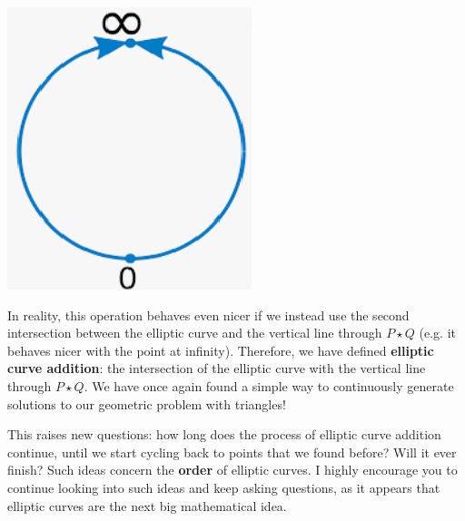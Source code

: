 \documentclass{article}
\begin{document}
\begin{center}
    \includegraphics[scale=1.0]{images/curve4.png}
\end{center}

In reality, this operation behaves even nicer if we instead use the second intersection between the elliptic curve and the vertical line through $P\star Q$ (e.g. it behaves nicer with the point at infinity). Therefore, we have defined \textbf{elliptic curve addition}: the intersection of the elliptic curve with the vertical line through $P\star Q$. We have once again found a simple way to continuously generate solutions to our geometric problem with triangles!

This raises new questions: how long does the process of elliptic curve addition continue, until we start cycling back to points that we found before? Will it ever finish? Such ideas concern the \textbf{order} of elliptic curves. I highly encourage you to continue looking into such ideas and keep asking questions, as it appears that elliptic curves are the next big mathematical idea.
\end{document}
